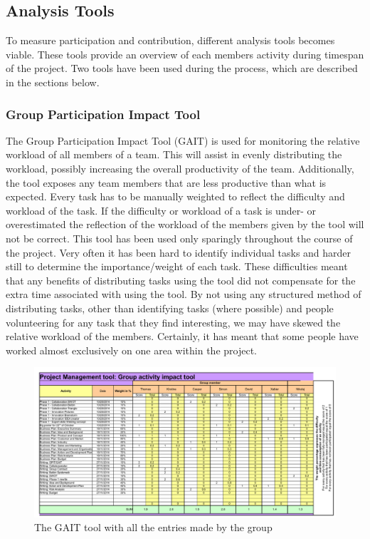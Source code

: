 
\subsection{Analysis Tools}
To measure participation and contribution, different analysis tools becomes viable. These tools provide an overview of each members activity during timespan of the project. Two tools have been used during the process, which are described in the sections below.

\subsubsection{Group Participation Impact Tool}
 The Group Participation Impact Tool (GAIT) is used for monitoring the relative workload of all members of a team. This will assist in evenly distributing the workload, possibly increasing the overall productivity of the team. Additionally, the tool exposes any team members that are less productive than what is expected. Every task has to be manually weighted to reflect the difficulty and workload of the task. If the difficulty or workload of a task is under- or overestimated the reflection of the workload of the members given by the tool will not be correct.
This tool has been used only sparingly throughout the course of the project. Very often it has been hard to identify individual tasks and harder still to determine the importance/weight of each task. These difficulties meant that any benefits of distributing tasks using the tool did not compensate for the extra time associated with using the tool. 
 By not using any structured method of distributing tasks, other than identifying tasks (where possible) and people volunteering for any task that they find interesting, we may have skewed the relative workload of the members. Certainly, it has meant that some people have worked almost exclusively on one area within the project.



\begin{landscape}
	\begin{figure}[h!]
		\includegraphics[scale=1.25]{./graphics/GAIT}
		\caption{The GAIT tool with all the entries made by the group}
		\label{fig:GAIT}
	\end{figure}
\end{landscape}




